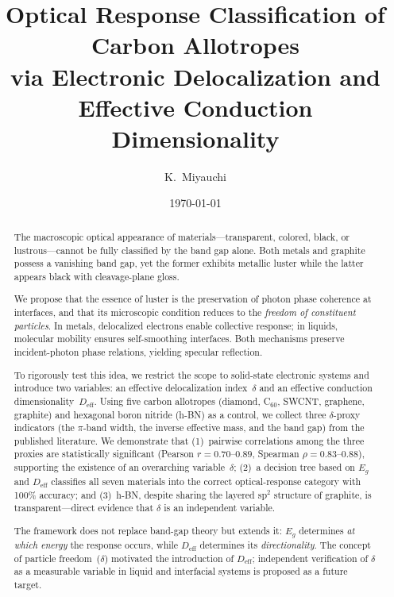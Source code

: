 \documentclass[twocolumn,showpacs,preprintnumbers,amsmath,amssymb,prb]{revtex4-2}
\begin{document}

\title{Optical Response Classification of Carbon Allotropes \\
via Electronic Delocalization and Effective Conduction Dimensionality}

\author{K.~Miyauchi}

\date{\today}

\begin{abstract}
The macroscopic optical appearance of materials---transparent, colored,
black, or lustrous---cannot be fully classified by the band gap alone.
Both metals and graphite possess a vanishing band gap, yet the former
exhibits metallic luster while the latter appears black with cleavage-plane
gloss.

We propose that the essence of luster is the preservation of photon phase
coherence at interfaces, and that its microscopic condition reduces to the
\emph{freedom of constituent particles}. In metals, delocalized electrons
enable collective response; in liquids, molecular mobility ensures
self-smoothing interfaces. Both mechanisms preserve incident-photon phase
relations, yielding specular reflection.

To rigorously test this idea, we restrict the scope to solid-state
electronic systems and introduce two variables: an effective delocalization
index~$\delta$ and an effective conduction dimensionality~$D_\mathrm{eff}$.
Using five carbon allotropes (diamond, C$_{60}$, SWCNT, graphene, graphite)
and hexagonal boron nitride (h-BN) as a control, we collect three
$\delta$-proxy indicators (the $\pi$-band width, the inverse effective mass,
and the band gap) from the published literature. We demonstrate that
(1)~pairwise correlations among the three proxies are statistically
significant (Pearson $r = 0.70$--$0.89$, Spearman $\rho = 0.83$--$0.88$),
supporting the existence of an overarching variable~$\delta$;
(2)~a decision tree based on $E_g$ and $D_\mathrm{eff}$ classifies all
seven materials into the correct optical-response category with 100\%
accuracy; and
(3)~h-BN, despite sharing the layered sp$^2$ structure of graphite, is
transparent---direct evidence that $\delta$ is an independent variable.

The framework does not replace band-gap theory but extends it: $E_g$
determines \emph{at which energy} the response occurs, while
$D_\mathrm{eff}$ determines its \emph{directionality}. The concept of
particle freedom~($\delta$) motivated the introduction of
$D_\mathrm{eff}$; independent verification of $\delta$ as a measurable
variable in liquid and interfacial systems is proposed as a future
target.
\end{abstract}
\end{document}
